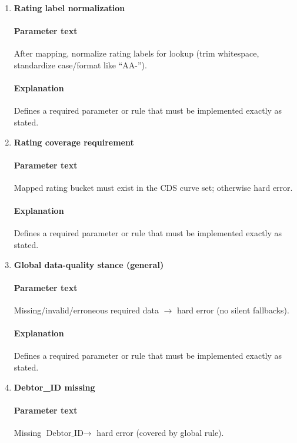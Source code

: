 \documentclass[11pt]{article}
\begin{document}
\begin{enumerate}[label=\arabic*),leftmargin=*,align=left]
\paragraph{Explanation} Defines a required parameter or rule that must be implemented exactly as stated.

\item \textbf{Rating label normalization}
\paragraph{Parameter text} After mapping, normalize rating labels for lookup (trim whitespace, standardize case/format like ``AA-'').
\paragraph{Explanation} Defines a required parameter or rule that must be implemented exactly as stated.

\item \textbf{Rating coverage requirement}
\paragraph{Parameter text} Mapped rating bucket must exist in the CDS curve set; otherwise hard error.
\paragraph{Explanation} Defines a required parameter or rule that must be implemented exactly as stated.

\item \textbf{Global data-quality stance (general)}
\paragraph{Parameter text} Missing/invalid/erroneous required data $\rightarrow$ hard error (no silent fallbacks).
\paragraph{Explanation} Defines a required parameter or rule that must be implemented exactly as stated.

\item \textbf{Debtor\_ID missing}
\paragraph{Parameter text} Missing $\text{Debtor\_ID} \rightarrow$ hard error (covered by global rule).

\end{enumerate}
\end{document}
